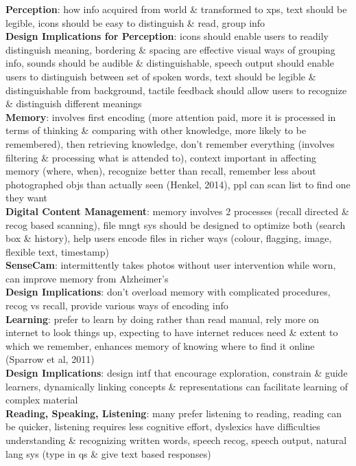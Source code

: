 \documentclass[a4paper]{article}
\begin{document}
\begin{multicols}{3}
        \textbf{Perception}: how info acquired from world \& transformed to xps, text should be legible, icons should be easy to distinguish \& read, group info\\
        \textbf{Design Implications for Perception}: icons should enable users to readily distinguish meaning, bordering \& spacing are effective visual ways of grouping info, sounds should be audible \& distinguishable, speech output should enable users to distinguish between set of spoken words, text should be legible \& distinguishable from background, tactile feedback should allow users to recognize \& distinguish different meanings\\
        \textbf{Memory}: involves first encoding (more attention paid, more it is processed in terms of thinking \& comparing with other knowledge, more likely to be remembered), then retrieving knowledge, don't remember everything (involves filtering \& processing what is attended to), context important in affecting memory (where, when), recognize better than recall, remember less about photographed objs than actually seen (Henkel, 2014), ppl can scan list to find one they want\\
        \textbf{Digital Content Management}: memory involves 2 processes (recall directed \& recog based scanning), file mngt sys should be designed to optimize both (search box \& history), help users encode files in richer ways (colour, flagging, image, flexible text, timestamp)\\
        \textbf{SenseCam}: intermittently takes photos without user intervention while worn, can improve memory from Alzheimer's\\
        \textbf{Design Implications}: don't overload memory with complicated procedures, recog vs recall, provide various ways of encoding info\\
        \textbf{Learning}: prefer to learn by doing rather than read manual, rely more on internet to look things up, expecting to have internet reduces need \& extent to which we remember, enhances memory of knowing where to find it online (Sparrow et al, 2011)\\
        \textbf{Design Implications}: design intf that encourage exploration, constrain \& guide learners, dynamically linking concepts \& representations can facilitate learning of complex material\\
        \textbf{Reading, Speaking, Listening}: many prefer listening to reading, reading can be quicker, listening requires less cognitive effort, dyslexics have difficulties understanding \& recognizing written words, speech recog, speech output, natural lang sys (type in qs \& give text based responses)\\

\end{multicols}
\end{document}
